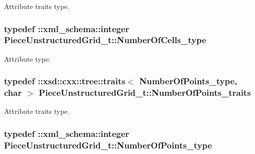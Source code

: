Attribute traits type. 

\hypertarget{classPieceUnstructuredGrid__t_aeae5546900c50a4abe9b3aea485e97d0}{
\subsubsection[{Number\+Of\+Cells\+\_\+type}]{\setlength{\rightskip}{0pt plus 5cm}typedef \+::{\bf xml\+\_\+schema\+::integer} {\bf Piece\+Unstructured\+Grid\+\_\+t\+::\+Number\+Of\+Cells\+\_\+type}}}\label{classPieceUnstructuredGrid__t_aeae5546900c50a4abe9b3aea485e97d0}


Attribute type. 

\hypertarget{classPieceUnstructuredGrid__t_acdfbb1dc264a5a48bcc6d4aa815db003}{
\subsubsection[{Number\+Of\+Points\+\_\+traits}]{\setlength{\rightskip}{0pt plus 5cm}typedef \+::xsd\+::cxx\+::tree\+::traits$<$ {\bf Number\+Of\+Points\+\_\+type}, char $>$ {\bf Piece\+Unstructured\+Grid\+\_\+t\+::\+Number\+Of\+Points\+\_\+traits}}}\label{classPieceUnstructuredGrid__t_acdfbb1dc264a5a48bcc6d4aa815db003}


Attribute traits type. 

\hypertarget{classPieceUnstructuredGrid__t_a8df1cd0d138d990e166d325ceed9a660}{
\subsubsection[{Number\+Of\+Points\+\_\+type}]{\setlength{\rightskip}{0pt plus 5cm}typedef \+::{\bf xml\+\_\+schema\+::integer} {\bf Piece\+Unstructured\+Grid\+\_\+t\+::\+Number\+Of\+Points\+\_\+type}}}\label{classPieceUnstructuredGrid__t_a8df1cd0d138d990e166d325ceed9a660}


